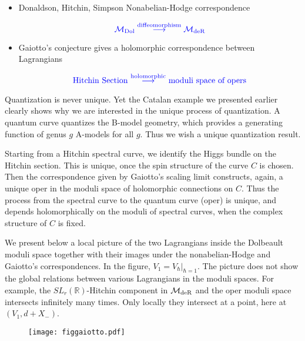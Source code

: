 \documentclass[oneside, 11pt]{amsart}
\theoremstyle{definition}
\numberwithin{equation}{subsection}
\def\deR{{\text{\rm{deR}}}}
\newcommand{\bR}{{\mathbb{R}}}
\newcommand{\cM}{{\mathcal{M}}}
\begin{document}
{\begin{itemize}
\item {\color{red} Donaldson, Hitchin, Simpson} Nonabelian-Hodge correspondence

$${\color{blue} \mathcal{M}_{\text{Dol}}\stackrel{\text{diffeomorphism}}{\longrightarrow}\mathcal{M}_{\text{deR}}}$$

\item {\color{red} Gaiotto's conjecture} gives a holomorphic correspondence between Lagrangians 

$$
\text{\color{blue} Hitchin Section $\stackrel{\text{holomorphic}}{\longrightarrow}$ moduli space of opers}
$$
\end{itemize}

Quantization is never unique. Yet the Catalan 
example we presented earlier clearly 
shows why we are interested in 
the unique process of quantization. A quantum curve
quantizes the B-model geometry, which provides
a generating function of genus $g$ A-models for
all $g$. Thus we wish a unique quantization result.

Starting from a Hitchin spectral curve, we identify the
Higgs bundle on the Hitchin section. This is 
unique, once the spin structure of the curve
$C$ is chosen. Then the correspondence 
given by Gaiotto's scaling limit constructs, again, a 
unique oper in the moduli space of holomorphic
connections on $C$. Thus the process from the
spectral curve to the quantum curve (oper) is unique, and
depends holomorphically on the moduli of spectral
curves, when the complex structure of $C$ is 
fixed.


We present below a local
picture of the two Lagrangians inside the Dolbeault moduli space together with their images under the nonabelian-Hodge and Gaiotto's correspondences.
In the figure, $V_1 = V_\hbar|_{\hbar = 1}$.
The picture does not show the global 
relations between various Lagrangians in the
moduli spaces. For example, the $SL_r(\bR)$-Hitchin
component in $\cM_{\deR}$ and the oper moduli 
space intersects infinitely many times. Only locally
they intersect at a point, here at $(V_1,d+X_-)$. 

\vspace{0.5 in}
\begin{figure}[htb]


\texttt{[image: figgaiotto.pdf]}


\end{figure}



\vfill




}
\end{document}
